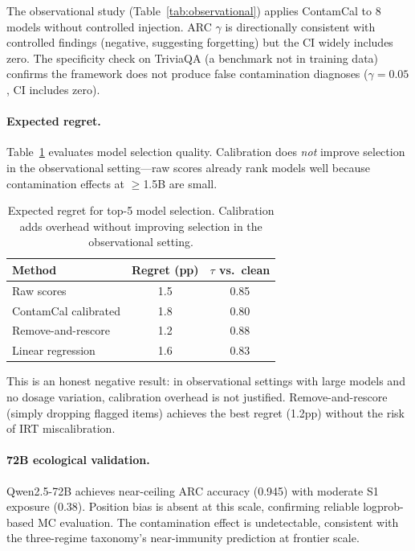 \documentclass[11pt,a4paper]{article}
\begin{document}
The observational study (Table~\ref{tab:observational}) applies ContamCal to 8 models without controlled injection. ARC $\gamma$ is directionally consistent with controlled findings (negative, suggesting forgetting) but the CI widely includes zero. The specificity check on TriviaQA (a benchmark not in training data) confirms the framework does not produce false contamination diagnoses ($\gamma = 0.05$, CI includes zero).

\paragraph{Expected regret.} Table~\ref{tab:regret} evaluates model selection quality. Calibration does \emph{not} improve selection in the observational setting---raw scores already rank models well because contamination effects at $\geq$1.5B are small.

\begin{table}[t]
\centering
\small
\caption{Expected regret for top-5 model selection. Calibration adds overhead without improving selection in the observational setting.}
\label{tab:regret}
\begin{tabular}{lcc}
\toprule
Method & Regret (pp) & $\tau$ vs.\ clean \\
\midrule
Raw scores & 1.5 & 0.85 \\
ContamCal calibrated & 1.8 & 0.80 \\
Remove-and-rescore & 1.2 & 0.88 \\
Linear regression & 1.6 & 0.83 \\
\bottomrule
\end{tabular}
\end{table}

This is an honest negative result: in observational settings with large models and no dosage variation, calibration overhead is not justified. Remove-and-rescore (simply dropping flagged items) achieves the best regret (1.2pp) without the risk of IRT miscalibration.

\paragraph{72B ecological validation.} Qwen2.5-72B achieves near-ceiling ARC accuracy (0.945) with moderate S1 exposure (0.38). Position bias is absent at this scale, confirming reliable logprob-based MC evaluation. The contamination effect is undetectable, consistent with the three-regime taxonomy's near-immunity prediction at frontier scale.
\end{document}
